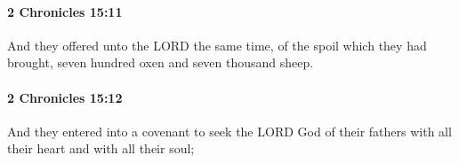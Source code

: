 		\paragraph{2 Chronicles 15:11} %
			\label{2CHRONICLES-15-11}

			And they offered unto the LORD the same time, of the spoil which they had brought, seven hundred oxen and seven thousand sheep.


		\paragraph{2 Chronicles 15:12} %
			\label{2CHRONICLES-15-12}

			And they entered into a covenant to seek the LORD God of their fathers with all their heart and with all their soul;


